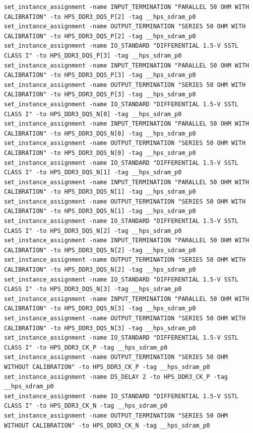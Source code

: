 \documentclass[conference]{IEEEtran}
\begin{document}
\begin{lstlisting}
set_instance_assignment -name INPUT_TERMINATION "PARALLEL 50 OHM WITH CALIBRATION" -to HPS_DDR3_DQS_P[2] -tag __hps_sdram_p0
set_instance_assignment -name OUTPUT_TERMINATION "SERIES 50 OHM WITH CALIBRATION" -to HPS_DDR3_DQS_P[2] -tag __hps_sdram_p0
set_instance_assignment -name IO_STANDARD "DIFFERENTIAL 1.5-V SSTL CLASS I" -to HPS_DDR3_DQS_P[3] -tag __hps_sdram_p0
set_instance_assignment -name INPUT_TERMINATION "PARALLEL 50 OHM WITH CALIBRATION" -to HPS_DDR3_DQS_P[3] -tag __hps_sdram_p0
set_instance_assignment -name OUTPUT_TERMINATION "SERIES 50 OHM WITH CALIBRATION" -to HPS_DDR3_DQS_P[3] -tag __hps_sdram_p0
set_instance_assignment -name IO_STANDARD "DIFFERENTIAL 1.5-V SSTL CLASS I" -to HPS_DDR3_DQS_N[0] -tag __hps_sdram_p0
set_instance_assignment -name INPUT_TERMINATION "PARALLEL 50 OHM WITH CALIBRATION" -to HPS_DDR3_DQS_N[0] -tag __hps_sdram_p0
set_instance_assignment -name OUTPUT_TERMINATION "SERIES 50 OHM WITH CALIBRATION" -to HPS_DDR3_DQS_N[0] -tag __hps_sdram_p0
set_instance_assignment -name IO_STANDARD "DIFFERENTIAL 1.5-V SSTL CLASS I" -to HPS_DDR3_DQS_N[1] -tag __hps_sdram_p0
set_instance_assignment -name INPUT_TERMINATION "PARALLEL 50 OHM WITH CALIBRATION" -to HPS_DDR3_DQS_N[1] -tag __hps_sdram_p0
set_instance_assignment -name OUTPUT_TERMINATION "SERIES 50 OHM WITH CALIBRATION" -to HPS_DDR3_DQS_N[1] -tag __hps_sdram_p0
set_instance_assignment -name IO_STANDARD "DIFFERENTIAL 1.5-V SSTL CLASS I" -to HPS_DDR3_DQS_N[2] -tag __hps_sdram_p0
set_instance_assignment -name INPUT_TERMINATION "PARALLEL 50 OHM WITH CALIBRATION" -to HPS_DDR3_DQS_N[2] -tag __hps_sdram_p0
set_instance_assignment -name OUTPUT_TERMINATION "SERIES 50 OHM WITH CALIBRATION" -to HPS_DDR3_DQS_N[2] -tag __hps_sdram_p0
set_instance_assignment -name IO_STANDARD "DIFFERENTIAL 1.5-V SSTL CLASS I" -to HPS_DDR3_DQS_N[3] -tag __hps_sdram_p0
set_instance_assignment -name INPUT_TERMINATION "PARALLEL 50 OHM WITH CALIBRATION" -to HPS_DDR3_DQS_N[3] -tag __hps_sdram_p0
set_instance_assignment -name OUTPUT_TERMINATION "SERIES 50 OHM WITH CALIBRATION" -to HPS_DDR3_DQS_N[3] -tag __hps_sdram_p0
set_instance_assignment -name IO_STANDARD "DIFFERENTIAL 1.5-V SSTL CLASS I" -to HPS_DDR3_CK_P -tag __hps_sdram_p0
set_instance_assignment -name OUTPUT_TERMINATION "SERIES 50 OHM WITHOUT CALIBRATION" -to HPS_DDR3_CK_P -tag __hps_sdram_p0
set_instance_assignment -name D5_DELAY 2 -to HPS_DDR3_CK_P -tag __hps_sdram_p0
set_instance_assignment -name IO_STANDARD "DIFFERENTIAL 1.5-V SSTL CLASS I" -to HPS_DDR3_CK_N -tag __hps_sdram_p0
set_instance_assignment -name OUTPUT_TERMINATION "SERIES 50 OHM WITHOUT CALIBRATION" -to HPS_DDR3_CK_N -tag __hps_sdram_p0

\end{lstlisting}
\end{document}
